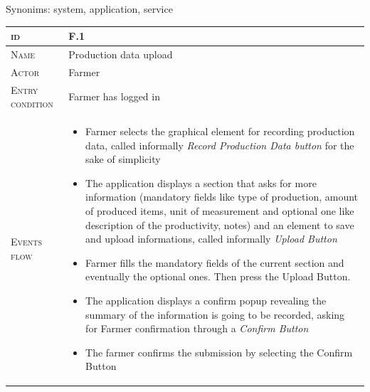 Synonims: system, application, service



\begin{table}[H]
    \centering
    \begin{tabular}[c]{|l|p{}|}
        \hline %
    	\textsc{id}                 &   F.1\\
    	\hline %
    	\textsc{Name}               &   Production data upload\\
    	\hline %
    	\textsc{Actor}             &   Farmer\\
    	\hline %
    	\textsc{Entry condition}   &   Farmer has logged in\\
    	\hline %
    	\textsc{Events flow}         &   %
            	                        \begin{itemize}
                                    	    \item Farmer selects the graphical element for recording production data, called informally \textit{Record Production Data button} for the sake of simplicity
                                    		\item The application displays a section that asks for more information (mandatory fields like type of production, amount of produced items, unit of measurement and optional one like description of the productivity, notes) and an element to save and upload informations, called informally \textit{Upload Button}
                                    		\item Farmer fills the mandatory fields of the current section and eventually the optional ones. Then press the Upload Button.
                                    		\item The application displays a confirm popup revealing the summary of the information is going to be recorded, asking for Farmer confirmation through a \textit{Confirm Button}
                                    		\item The farmer confirms the submission by selecting the Confirm Button
                                        \end{itemize}\\

\end{tabular}
\end{table}
